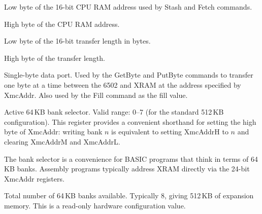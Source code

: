 

Low byte of the 16-bit CPU RAM address used by Stash and Fetch commands.


High byte of the CPU RAM address.



Low byte of the 16-bit transfer length in bytes.


High byte of the transfer length.



Single-byte data port.  Used by the GetByte and PutByte commands to transfer
one byte at a time between the 6502 and XRAM at the address specified by
XmcAddr.  Also used by the Fill command as the fill value.



Active 64\,KB bank selector.  Valid range: 0--7 (for the standard 512\,KB
configuration).  This register provides a convenient shorthand for setting
the high byte of XmcAddr: writing bank $n$ is equivalent to setting
XmcAddrH to $n$ and clearing XmcAddrM and XmcAddrL.

\begin{notebox}
The bank selector is a convenience for BASIC programs that think in terms
of 64\,KB banks.  Assembly programs typically address XRAM directly via the
24-bit XmcAddr registers.
\end{notebox}



Total number of 64\,KB banks available.  Typically 8, giving 512\,KB of
expansion memory.  This is a read-only hardware configuration value.


